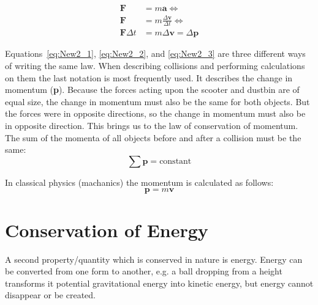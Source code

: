 \documentclass[12pt,a4paper]{article}
\numberwithin{equation}{section}
\numberwithin{figure}{section}
\numberwithin{table}{section}
\begin{document}
\begin{align}
\textbf{F} &= m\textbf{a}  \Longleftrightarrow \label{eq:New2_1} \\
\textbf{F} &= m\frac{\Delta \textbf{v}}{\Delta t} \Longleftrightarrow \label{eq:New2_2} \\
\textbf{F} \Delta t &= m\Delta \textbf{v} = \Delta \textbf{p} \label{eq:New2_3}
\end{align}

Equations~\ref{eq:New2_1}, \ref{eq:New2_2}, and \ref{eq:New2_3} are three different ways of writing the same law. When describing collisions and performing calculations on them the last notation is most frequently used. It describes the change in momentum (\textbf{p}). Because the forces acting upon the scooter and dustbin are of equal size, the change in momentum must also be the same for both objects. But the forces were in opposite directions, so the change in momentum must also be in opposite direction. This brings us to the law of conservation of momentum. The sum of the momenta of all objects before and after a collision must be the same:
\begin{equation}
\sum \textbf{p} = \mbox{constant}
\end{equation}

In classical physics (machanics) the momentum is calculated as follows:
\begin{equation}
\textbf{p}=m\textbf{v}
\end{equation}

\section{Conservation of Energy}
A second property/quantity which is conserved in nature is energy. Energy can be converted from one form to another, e.g. a ball dropping from a height transforms it potential gravitational energy into kinetic energy, but energy cannot disappear or be created.
\end{document}

